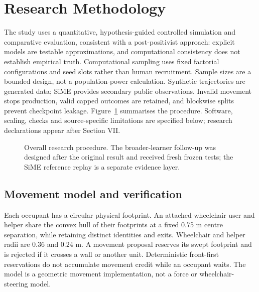 \documentclass[conference]{IEEEtran}
\begin{document}
\section{Research Methodology}
The study uses a quantitative, hypothesis-guided controlled simulation and comparative evaluation, consistent with a post-positivist approach: explicit models are testable approximations, and computational consistency does not establish empirical truth. Computational sampling uses fixed factorial configurations and seed slots rather than human recruitment. Sample sizes are a bounded design, not a population-power calculation. Synthetic trajectories are generated data; SiME provides secondary public observations. Invalid movement stops production, valid capped outcomes are retained, and blockwise splits prevent checkpoint leakage. Figure~\ref{fig:workflow} summarises the procedure. Software, scaling, checks and source-specific limitations are specified below; research declarations appear after Section VII.

\begin{figure}[!t]\centering
{}
\caption{Overall research procedure. The broader-learner follow-up was designed after the original result and received fresh frozen tests; the SiME reference replay is a separate evidence layer.}
\label{fig:workflow}
\end{figure}


\subsection{Movement model and verification}
Each occupant has a circular physical footprint. An attached wheelchair user and helper share the convex hull of their footprints at a fixed 0.75 m centre separation, while retaining distinct identities and exits. Wheelchair and helper radii are 0.36 and 0.24 m. A movement proposal reserves its swept footprint and is rejected if it crosses a wall or another unit. Deterministic front-first reservations do not accumulate movement credit while an occupant waits. The model is a geometric movement implementation, not a force or wheelchair-steering model.
\end{document}
